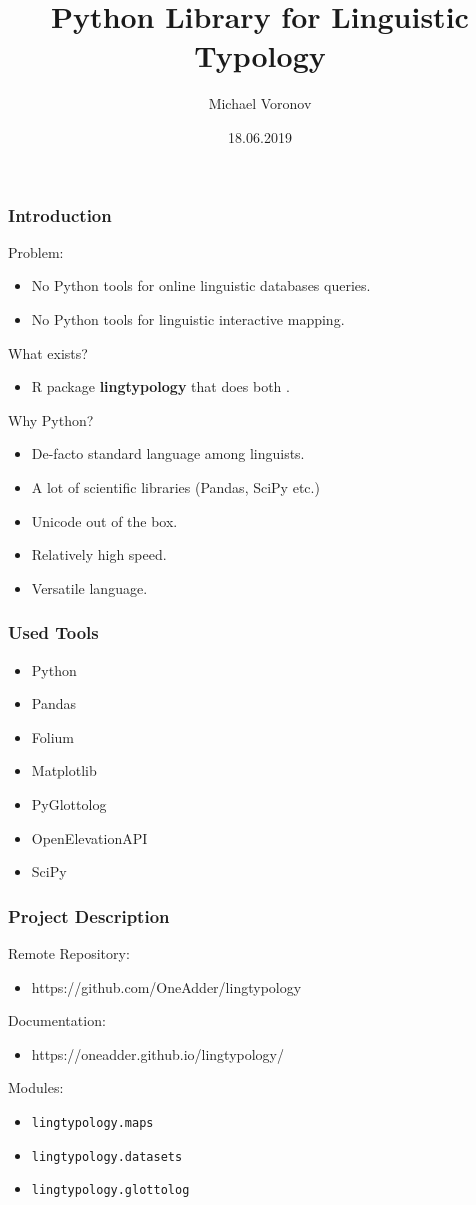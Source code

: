 \documentclass{beamer}
\title{Python Library for Linguistic Typology}
\author{Michael Voronov}
\institute{Higher School of Economics}
\date{18.06.2019}
\begin{document}
 
\frame{\titlepage}
 
\begin{frame}
\frametitle{Introduction}
Problem:
\begin{itemize}
 \item No Python tools for online linguistic databases queries.
 \item No Python tools for linguistic interactive mapping.
\end{itemize}
What exists?
\begin{itemize}
 \item R package \textbf{lingtypology} that does both \parencite{GeorgeMoroz2018}.
\end{itemize}
Why Python?
\begin{itemize}
 \item De-facto standard language among linguists.
 \item A lot of scientific libraries (Pandas, SciPy etc.)
 \item Unicode out of the box.
 \item Relatively high speed.
 \item Versatile language.
\end{itemize}
\end{frame}
 
\begin{frame}
\frametitle{Used Tools}
\begin{itemize}
 \item Python \parencite{python}
 \item Pandas \parencite{pandas}
 \item Folium \parencite{folium}
 \item Matplotlib \parencite{matplotlib}
 \item PyGlottolog \parencite{Robert2Forkel2019}
 \item OpenElevationAPI \parencite{OpenElevation}
 \item SciPy \parencite{scipy}
\end{itemize}
\end{frame}


\begin{frame}
\frametitle{Project Description}
Remote Repository:
\begin{itemize}
 \item https://github.com/OneAdder/lingtypology
\end{itemize}
Documentation:
\begin{itemize}
 \item https://oneadder.github.io/lingtypology/
\end{itemize}
Modules:
\begin{itemize}
 \item \texttt{lingtypology.maps}
 \item \texttt{lingtypology.datasets}
 \item \texttt{lingtypology.glottolog}
\end{itemize}
\end{frame}
\end{document}
